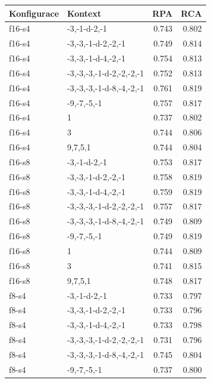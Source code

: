 \begin{table}[h!]
\centering
\begin{tabular}{llrr}

\toprule
Konfigurace &                   Kontext &   RPA &   RCA \\
\midrule
     f16-s4 &              -3,-1-d-2,-1 & 0.743 & 0.802 \\
     f16-s4 &        -3,-3,-1-d-2,-2,-1 & 0.749 & 0.814 \\
     f16-s4 &        -3,-3,-1-d-4,-2,-1 & 0.754 & 0.813 \\
     f16-s4 &  -3,-3,-3,-1-d-2,-2,-2,-1 & 0.752 & 0.813 \\
     f16-s4 &  -3,-3,-3,-1-d-8,-4,-2,-1 & 0.761 & 0.819 \\
     f16-s4 &               -9,-7,-5,-1 & 0.757 & 0.817 \\
     f16-s4 &                         1 & 0.737 & 0.802 \\
     f16-s4 &                         3 & 0.744 & 0.806 \\
     f16-s4 &                   9,7,5,1 & 0.744 & 0.804 \\
     f16-s8 &              -3,-1-d-2,-1 & 0.753 & 0.817 \\
     f16-s8 &        -3,-3,-1-d-2,-2,-1 & 0.758 & 0.819 \\
     f16-s8 &        -3,-3,-1-d-4,-2,-1 & 0.759 & 0.819 \\
     f16-s8 &  -3,-3,-3,-1-d-2,-2,-2,-1 & 0.757 & 0.817 \\
     f16-s8 &  -3,-3,-3,-1-d-8,-4,-2,-1 & 0.749 & 0.809 \\
     f16-s8 &               -9,-7,-5,-1 & 0.749 & 0.819 \\
     f16-s8 &                         1 & 0.744 & 0.809 \\
     f16-s8 &                         3 & 0.741 & 0.815 \\
     f16-s8 &                   9,7,5,1 & 0.748 & 0.817 \\
      f8-s4 &              -3,-1-d-2,-1 & 0.733 & 0.797 \\
      f8-s4 &        -3,-3,-1-d-2,-2,-1 & 0.733 & 0.796 \\
      f8-s4 &        -3,-3,-1-d-4,-2,-1 & 0.733 & 0.798 \\
      f8-s4 &  -3,-3,-3,-1-d-2,-2,-2,-1 & 0.731 & 0.796 \\
      f8-s4 &  -3,-3,-3,-1-d-8,-4,-2,-1 & 0.745 & 0.804 \\
      f8-s4 &               -9,-7,-5,-1 & 0.737 & 0.800 \\

\end{tabular}
\end{table}
